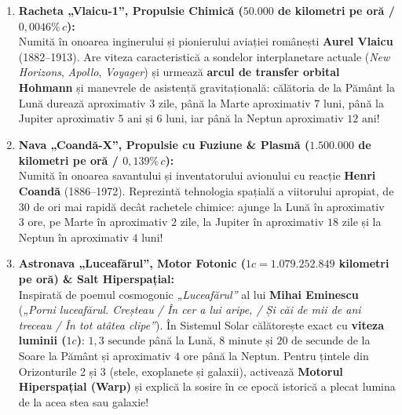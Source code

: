 \begin{tcolorbox}[orbitardata, title={\textbf{Flota Spațială Didactică din Orbitar (\texttt{SpacecraftPilot.ts})}}]
\begin{enumerate}[leftmargin=1.5em, itemsep=5pt]
  \item \textbf{Racheta „Vlaicu-1”, Propulsie Chimică ($50.000$ de kilometri pe oră / $0{,}0046\%\,c$):}\\
  Numită în onoarea inginerului și pionierului aviației românești \textbf{Aurel Vlaicu} (1882--1913). Are viteza caracteristică a sondelor interplanetare actuale (\emph{New Horizons}, \emph{Apollo}, \emph{Voyager}) și urmează \textbf{arcul de transfer orbital Hohmann} și manevrele de asistență gravitațională: călătoria de la Pământ la Lună durează aproximativ $3\text{ zile}$, până la Marte aproximativ $7\text{ luni}$, până la Jupiter aproximativ $5\text{ ani și } 6\text{ luni}$, iar până la Neptun aproximativ $12\text{ ani}$!
  \item \textbf{Nava „Coandă-X”, Propulsie cu Fuziune \& Plasmă ($1.500.000$ de kilometri pe oră / $0{,}139\%\,c$):}\\
  Numită în onoarea savantului și inventatorului avionului cu reacție \textbf{Henri Coandă} (1886--1972). Reprezintă tehnologia spațială a viitorului apropiat, de 30 de ori mai rapidă decât rachetele chimice: ajunge la Lună în aproximativ $3\text{ ore}$, pe Marte în aproximativ $2\text{ zile}$, la Jupiter în aproximativ $18\text{ zile}$ și la Neptun în aproximativ $4\text{ luni}$!
  \item \textbf{Astronava „Luceafărul”, Motor Fotonic ($1c = 1.079.252.849$ kilometri pe oră) \& Salt Hiperspațial:}\\
  Inspirată de poemul cosmogonic \emph{„Luceafărul”} al lui \textbf{Mihai Eminescu} (\emph{„Porni luceafărul. Creșteau / În cer a lui aripe, / Și căi de mii de ani treceau / În tot atâtea clipe”}). În Sistemul Solar călătorește exact cu \textbf{viteza luminii ($1c$)}: $1{,}3\text{ secunde}$ până la Lună, $8\text{ minute și } 20\text{ de secunde}$ de la Soare la Pământ și aproximativ $4\text{ ore}$ până la Neptun. Pentru țintele din Orizonturile 2 și 3 (stele, exoplanete și galaxii), activează \textbf{Motorul Hiperspațial (Warp)} și explică la sosire în ce epocă istorică a plecat lumina de la acea stea sau galaxie!
\end{enumerate}
\end{tcolorbox}

